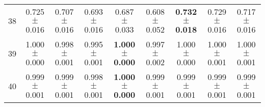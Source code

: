 \begin{table}[!ht]
{\begin{tabular}{r c c c c c c c c}
38 & 0.725 $\pm$ 0.016 & 0.707 $\pm$ 0.016 & 0.693 $\pm$ 0.016 & 0.687 $\pm$ 0.033 & 0.608 $\pm$ 0.052 & \textbf{0.732 $\pm$ 0.018} & 0.729 $\pm$ 0.016 & 0.717 $\pm$ 0.016 \\
39 & 1.000 $\pm$ 0.000 & 0.998 $\pm$ 0.001 & 0.995 $\pm$ 0.001 & \textbf{1.000 $\pm$ 0.000} & 0.997 $\pm$ 0.002 & 1.000 $\pm$ 0.000 & 1.000 $\pm$ 0.001 & 1.000 $\pm$ 0.001 \\
40 & 0.999 $\pm$ 0.001 & 0.999 $\pm$ 0.001 & 0.998 $\pm$ 0.001 & \textbf{1.000 $\pm$ 0.000} & 0.999 $\pm$ 0.001 & 0.999 $\pm$ 0.001 & 0.999 $\pm$ 0.001 & 0.999 $\pm$ 0.001 \\
\end{tabular}}
\end{table}
